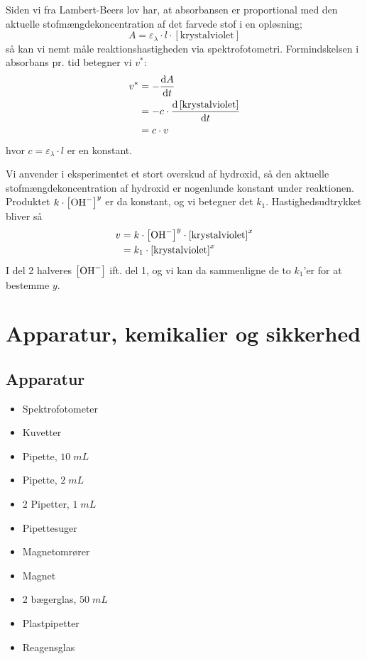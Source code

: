 \documentclass{report}
\begin{document}
Siden vi fra Lambert-Beers lov har, at absorbansen er proportional med den aktuelle stofmængdekoncentration af det farvede stof i en opløsning;
\[
A=\varepsilon _{\lambda } \cdot l \cdot [\text{krystalviolet} ]
\] 
så kan vi nemt måle reaktionshastigheden via spektrofotometri.
Formindskelsen i absorbans pr. tid betegner vi $v^*$:
\begin{equation*}
\begin{split}
  v^* &=- \dv{A}{t}\\
  &=-c \cdot \dv{\left[\text{krystalviolet} \right]}{t}\\
  &=c \cdot v
\end{split}
\end{equation*}
hvor $c=\varepsilon _{\lambda } \cdot l$ er en konstant. 

Vi anvender i eksperimentet et stort overskud af hydroxid, så den aktuelle stofmængdekoncentration af hydroxid er nogenlunde konstant under reaktionen.
Produktet $k \cdot \left[\ce{OH-} \right] ^{y}$ er da konstant, og vi betegner det $k_1$.
Hastighedsudtrykket bliver så
\begin{equation*}
\begin{split}
  v &= k \cdot \left[\ce{OH-} \right] ^{y} \cdot \left[\text{krystalviolet} \right] ^{x}\\
  &=k_1 \cdot \left[\text{krystalviolet} \right] ^{x}
\end{split}
\end{equation*}
I del 2 halveres $\left[\ce{OH-} \right]$ ift. del 1, og vi kan da sammenligne de to $k_1$'er for at bestemme $y$.

\section*{Apparatur, kemikalier og sikkerhed}
\subsection*{Apparatur}
\begin{multicols}{3}
 \begin{itemize}
  \item Spektrofotometer
  \item Kuvetter
  \item Pipette, $10 \;\unit{mL} $ 
  \item Pipette, $2 \;\unit{mL} $
  \item 2 Pipetter, $1 \;\unit{mL} $
  \item Pipettesuger 
  \item Magnetomrører
  \item Magnet
  \item 2 bægerglas, $50 \;\unit{mL} $
  \item Plastpipetter 
  \item Reagensglas 
 \end{itemize} 
\end{multicols}
\end{document}
